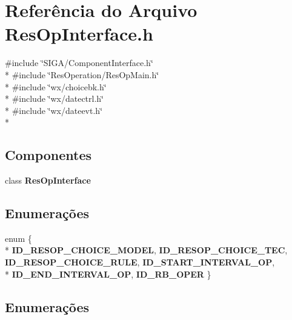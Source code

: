 \section{Referência do Arquivo Res\+Op\+Interface.\+h}
\label{_res_op_interface_8h}
{\ttfamily \#include \char`\"{}S\+I\+G\+A/\+Component\+Interface.\+h\char`\"{}}\\*
{\ttfamily \#include \char`\"{}Res\+Operation/\+Res\+Op\+Main.\+h\char`\"{}}\\*
{\ttfamily \#include \char`\"{}wx/choicebk.\+h\char`\"{}}\\*
{\ttfamily \#include \char`\"{}wx/datectrl.\+h\char`\"{}}\\*
{\ttfamily \#include \char`\"{}wx/dateevt.\+h\char`\"{}}\\*
\subsection*{Componentes}
\begin{DoxyCompactItemize}
\item 
class {\bf Res\+Op\+Interface}
\end{DoxyCompactItemize}
\subsection*{Enumerações}
\begin{DoxyCompactItemize}
\item 
enum \{ \\*
{\bf I\+D\+\_\+\+R\+E\+S\+O\+P\+\_\+\+C\+H\+O\+I\+C\+E\+\_\+\+M\+O\+D\+EL}, 
{\bf I\+D\+\_\+\+R\+E\+S\+O\+P\+\_\+\+C\+H\+O\+I\+C\+E\+\_\+\+T\+EC}, 
{\bf I\+D\+\_\+\+R\+E\+S\+O\+P\+\_\+\+C\+H\+O\+I\+C\+E\+\_\+\+R\+U\+LE}, 
{\bf I\+D\+\_\+\+S\+T\+A\+R\+T\+\_\+\+I\+N\+T\+E\+R\+V\+A\+L\+\_\+\+OP}, 
\\*
{\bf I\+D\+\_\+\+E\+N\+D\+\_\+\+I\+N\+T\+E\+R\+V\+A\+L\+\_\+\+OP}, 
{\bf I\+D\+\_\+\+R\+B\+\_\+\+O\+P\+ER}
 \}
\end{DoxyCompactItemize}


\subsection{Enumerações}
